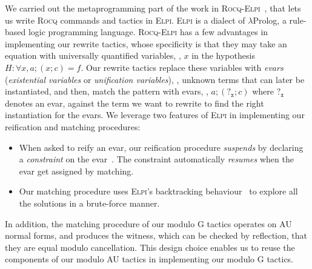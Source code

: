 \documentclass[a4paper,UKenglish,cleveref,autoref]{lipics-v2021}
\newcommand\evar[1]{\ensuremath{?_{\texttt{#1}}}}
\newcommand{\Rocq}{{\sffamily\scshape Rocq}\xspace}
\newcommand{\Elpi}{{\sffamily\scshape Elpi}\xspace}
\newcommand{\RocqElpi}{{\sffamily\scshape Rocq-Elpi}\xspace}
\begin{document}
We carried out the metaprogramming part of the work in \RocqElpi~\cite{Tassi:habilitation}, that
lets us write \Rocq commands and tactics in \Elpi.
\Elpi is a dialect of $\lambda$Prolog, a rule-based logic programming language.
\RocqElpi has a few advantages in implementing our rewrite tactics, whose specificity is that they
may take an equation with universally quantified variables, \eg, $x$ in the hypothesis
$H : \forall x, a ; (x ; c) = f$.
Our rewrite tactics replace these variables with \emph{evars} (\emph{existential variables} or
\emph{unification variables}), \ie, unknown terms that can later be instantiated, and then, match
the pattern with evars, \eg, $a ; (\evar{x} ; c)$ where $\evar{x}$ denotes an evar, against the term
we want to rewrite to find the right instantiation for the evars.
We leverage two features of \Elpi in implementing our reification and matching procedures:
\begin{itemize}
\item When asked to reify an evar, our reification procedure \emph{suspends} by declaring
  a \emph{constraint} on the evar~\cite[Section 2.3]{Tassi:habilitation}. The constraint
  automatically \emph{resumes} when the evar get assigned by matching.
\item Our matching procedure uses \Elpi's backtracking behaviour~\cite[Section
  2.1]{Tassi:habilitation} to explore all the solutions in a brute-force manner.
\end{itemize}
\pagebreak
In addition, the matching procedure of our modulo G tactics operates on AU normal forms, and
produces the witness, which can be checked by reflection, that they are equal modulo cancellation.
This design choice enables us to reuse the components of our modulo AU tactics in implementing our
modulo G tactics.
\end{document}
